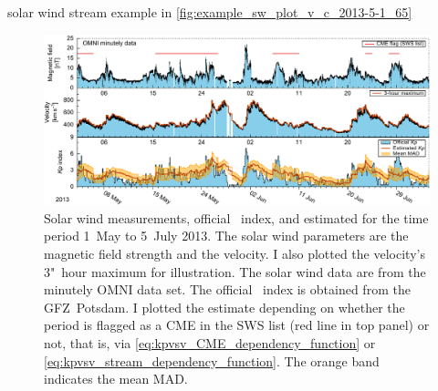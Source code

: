 solar wind stream example in \autoref{fig:example_sw_plot_v_c_2013-5-1_65}\\
\begin{figure}[htb]
	\centering
	\includegraphics[width=\textwidth]{figures_of_mine/chapter2/example_sw_plot_v_c_2013-5-1_65.pdf}
	\caption[]
	{Solar wind measurements, official \Kp{}~index, and estimated \Kp{} for the time period 1~May to 5~July 2013. The solar wind parameters are the magnetic field strength and the velocity. I also plotted the velocity's 3"~hour maximum for illustration. The solar wind data are from the minutely OMNI data set. The official \Kp{}~index is obtained from the GFZ~Potsdam. I plotted the \Kp{} estimate depending on whether the period is flagged as a CME in the SWS list (red line in top panel) or not, that is, via \autoref{eq:kpvsv_CME_dependency_function} or \autoref{eq:kpvsv_stream_dependency_function}. The orange band indicates the mean MAD.}
	\label{fig:example_sw_plot_v_c_2013-5-1_65}
\end{figure}


